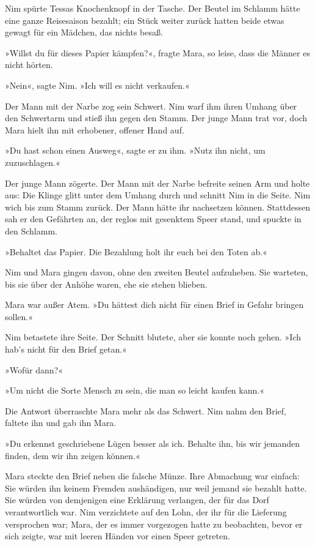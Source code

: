 \documentclass[10pt,a4paper]{article}
\begin{document}
Nim spürte Tessas Knochenknopf in der Tasche. Der Beutel im Schlamm hätte eine ganze Reisesaison bezahlt; ein Stück weiter zurück hatten beide etwas gewagt für ein Mädchen, das nichts besaß.

»Willst du für dieses Papier kämpfen?«, fragte Mara, so leise, dass die Männer es nicht hörten.

»Nein«, sagte Nim. »Ich will es nicht verkaufen.«

Der Mann mit der Narbe zog sein Schwert. Nim warf ihm ihren Umhang über den Schwertarm und stieß ihn gegen den Stamm. Der junge Mann trat vor, doch Mara hielt ihn mit erhobener, offener Hand auf.

»Du hast schon einen Ausweg«, sagte er zu ihm. »Nutz ihn nicht, um zuzuschlagen.«

Der junge Mann zögerte. Der Mann mit der Narbe befreite seinen Arm und holte aus: Die Klinge glitt unter dem Umhang durch und schnitt Nim in die Seite. Nim wich bis zum Stamm zurück. Der Mann hätte ihr nachsetzen können. Stattdessen sah er den Gefährten an, der reglos mit gesenktem Speer stand, und spuckte in den Schlamm.

»Behaltet das Papier. Die Bezahlung holt ihr euch bei den Toten ab.«

Nim und Mara gingen davon, ohne den zweiten Beutel aufzuheben. Sie warteten, bis sie über der Anhöhe waren, ehe sie stehen blieben.

Mara war außer Atem. »Du hättest dich nicht für einen Brief in Gefahr bringen sollen.«

Nim betastete ihre Seite. Der Schnitt blutete, aber sie konnte noch gehen. »Ich hab's nicht für den Brief getan.«

»Wofür dann?«

»Um nicht die Sorte Mensch zu sein, die man so leicht kaufen kann.«

Die Antwort überraschte Mara mehr als das Schwert. Nim nahm den Brief, faltete ihn und gab ihn Mara.

»Du erkennst geschriebene Lügen besser als ich. Behalte ihn, bis wir jemanden finden, dem wir ihn zeigen können.«

Mara steckte den Brief neben die falsche Münze. Ihre Abmachung war einfach: Sie würden ihn keinem Fremden aushändigen, nur weil jemand sie bezahlt hatte. Sie würden von demjenigen eine Erklärung verlangen, der für das Dorf verantwortlich war. Nim verzichtete auf den Lohn, der ihr für die Lieferung versprochen war; Mara, der es immer vorgezogen hatte zu beobachten, bevor er sich zeigte, war mit leeren Händen vor einen Speer getreten.
\end{document}

